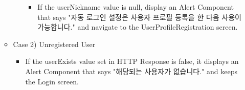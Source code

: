 \documentclass[conference]{IEEEtran}
\begin{document}
\begin{itemize}
\begin{itemize}
\begin{itemize}
\begin{itemize}
                \item If the userNickname value is null, display an Alert Component that says "자동 로그인 설정은 사용자 프로필 등록을 한 다음 사용이 가능합니다." and navigate to the UserProfileRegistration screen.
            \end{itemize}
        \end{itemize}
        \item Case 2) Unregistered User
        \begin{itemize}
            \item If the userExists value set in HTTP Response is false, it displays an Alert Component that says "해당되는 사용자가 없습니다." and keeps the Login screen.
            \\
        \end{itemize}
    \end{itemize}
\end{itemize}
\end{document}
